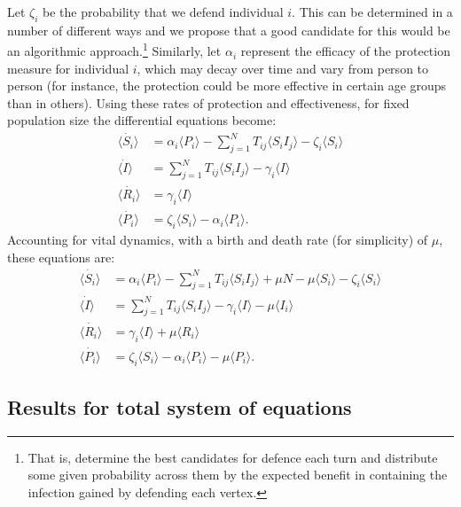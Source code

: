 \documentclass[12pt,a4paper]{article}
\begin{document}
Let $\zeta_i$ be the probability that we defend individual $i$. This can be determined in a number of different ways and we propose that a good candidate for this would be an algorithmic approach.\footnote{That is, determine the best candidates for defence each turn and distribute some given probability across them by the expected benefit in containing the infection gained by defending each vertex.} Similarly, let $\alpha_i$ represent the efficacy of the protection measure for individual $i$, which may decay over time and vary from person to person (for instance, the protection could be more effective in certain age groups than in others). Using these rates of protection and effectiveness, for fixed population size the differential equations become:
\begin{align}
\dot{\langle S_i \rangle} & = \alpha_i \langle P_i \rangle - \sum^{N}_{j=1}T_{ij} \langle S_i I_j \rangle - \zeta_i\langle S_i \rangle\\
\dot{\langle I \rangle} & =\sum^{N}_{j=1}T_{ij}\langle S_i I_j \rangle - \gamma_i \langle I \rangle \\
\dot{\langle R_i \rangle} & = \gamma_i \langle I \rangle \\
\dot{\langle P_i \rangle} & = \zeta_i \langle S_i \rangle - \alpha_i \langle P_i \rangle.
\end{align} 
Accounting for vital dynamics, with a birth and death rate (for simplicity) of $\mu$, these equations are:
\begin{align}
\dot{\langle S_i \rangle} & = \alpha_i \langle P_i \rangle - \sum^{N}_{j=1}T_{ij} \langle S_i I_j \rangle + \mu N - \mu \langle S_i \rangle - \zeta_i\langle S_i \rangle\\
\dot{\langle I \rangle} & =\sum^{N}_{j=1}T_{ij}\langle S_i I_j \rangle - \gamma_i \langle I \rangle - \mu \langle I_i \rangle\\
\dot{\langle R_i \rangle} & = \gamma_i \langle I \rangle + \mu \langle R_i \rangle\\
\dot{\langle P_i \rangle} & = \zeta_i \langle S_i \rangle - \alpha_i \langle P_i \rangle - \mu \langle P_i \rangle.
\end{align}

\subsection{Results for total system of equations}
\end{document}
